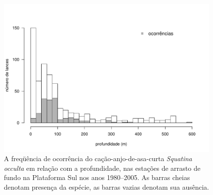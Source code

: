 \documentclass[a4paper,11pt,twoside,showtrims,onecolumn,openright,final]{memoir}
\begin{document}
\begin{figure}
\begin{center}
\includegraphics[width=\textwidth]{Occulta_DistribProf}
\end{center}
\caption[A freqüência de ocorrência do cação-anjo-de-asa-curta \emph{Squatina occulta} 
	em relação com a profundidade, nas estações de arrasto de 
	fundo na Plataforma Sul nos anos 1980--2005]
	{A freqüência de ocorrência do cação-anjo-de-asa-curta \emph{Squatina occulta} 
	em relação com a profundidade, nas estações de arrasto de 
	fundo na Plataforma Sul nos anos 1980--2005. 
	As barras cheias denotam presença da espécie, 
	as barras vazias denotam sua ausência.}
\label{fig:fo-occulta-profundidade}
\end{figure}


%
%
\end{document}
